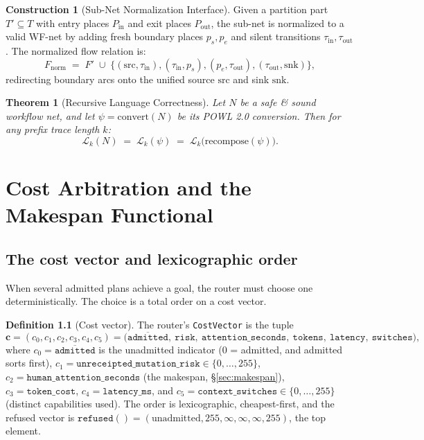 \documentclass[11pt,oneside]{book}
\theoremstyle{definition}
\newtheorem{definition}{Definition}[chapter]
\newtheorem{construction}{Construction}[chapter]
\theoremstyle{plain}
\newtheorem{theorem}{Theorem}[chapter]
\theoremstyle{remark}
\newcommand{\CostV}{\bm c}                     %
\newcommand{\code}[1]{\texttt{#1}}
\begin{document}
\begin{construction}[Sub-Net Normalization Interface]\label{con:normalize}
Given a partition part $T'\subseteq T$ with entry places $P_{\text{in}}$ and exit places $P_{\text{out}}$, the sub-net is normalized to a valid WF-net by adding fresh boundary places $p_s, p_e$ and silent transitions $\tau_{\text{in}}, \tau_{\text{out}}$. The normalized flow relation is:
\begin{equation}\label{eq:normalize}
F_{\text{norm}}\;=\;F' \;\cup\; \{ (\text{src}, \tau_{\text{in}}), (\tau_{\text{in}}, p_s), (p_e, \tau_{\text{out}}), (\tau_{\text{out}}, \text{snk}) \},
\end{equation}
redirecting boundary arcs onto the unified source $\text{src}$ and sink $\text{snk}$.
\end{construction}

\begin{theorem}[Recursive Language Correctness]\label{thm:lang-correct}
Let $N$ be a safe \& sound workflow net, and let $\psi = \text{convert}(N)$ be its POWL 2.0 conversion. Then for any prefix trace length $k$:
\[
\mathcal{L}_k(N) \;=\; \mathcal{L}_k(\psi) \;=\; \mathcal{L}_k\bigl(\text{recompose}(\psi)\bigr).
\]
\end{theorem}

\chapter{Cost Arbitration and the Makespan Functional}
\label{ch:cost}

\section{The cost vector and lexicographic order}

When several admitted plans achieve a goal, the router must choose one deterministically. The
choice is a total order on a cost vector.

\begin{definition}[Cost vector]\label{def:cost}
The router's \code{CostVector} is the tuple
\[
\CostV=(c_0,c_1,c_2,c_3,c_4,c_5)=
\bigl(\overline{\code{admitted}},\ \code{risk},\ \code{attention\_seconds},\ \code{tokens},\
\code{latency},\ \code{switches}\bigr),
\]
where $c_0=\overline{\code{admitted}}$ is the unadmitted indicator ($0$ = admitted, and
admitted sorts first), $c_1=\code{unreceipted\_mutation\_risk}\in\{0,\dots,255\}$,
$c_2=\code{human\_attention\_seconds}$ (the makespan, \S\ref{sec:makespan}),
$c_3=\code{token\_cost}$, $c_4=\code{latency\_ms}$, and
$c_5=\code{context\_switches}\in\{0,\dots,255\}$ (distinct capabilities used). The order is
lexicographic, cheapest-first, and the refused vector is
$\code{refused}()=(\text{unadmitted},255,\infty,\infty,\infty,255)$, the top element.
\end{definition}
\end{document}
